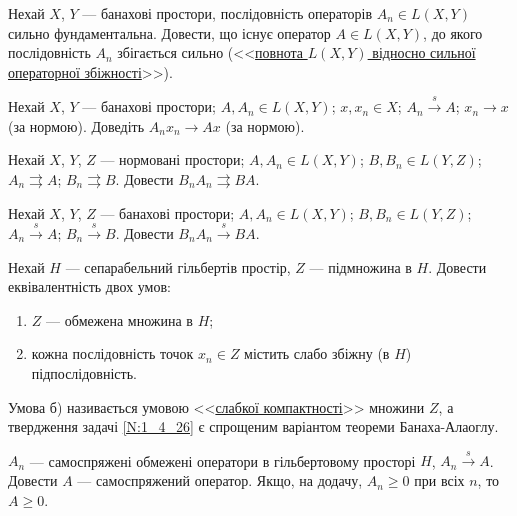 \begin{exercise}
    Нехай $X$, $Y$ --- банахові простори, послідовність операторів $A_n \in L(X,Y)$ сильно
    фундаментальна. Довести, що існує оператор $A \in L(X,Y)$, до якого послідовність $A_n$
    збігається сильно (<<\ul{повнота $L(X,Y)$ відносно сильної операторної збіжності}>>).
\end{exercise}

\begin{exercise}
    Нехай $X$, $Y$ --- банахові простори; $A, A_n \in L(X,Y)$; $x, x_n \in X$;
    $A_n \overset{s}{\to} A$; $x_n \to x$ (за нормою). Доведіть $A_n x_n \to Ax$ (за нормою).
\end{exercise}

\begin{exercise}
    Нехай $X$, $Y$, $Z$ --- нормовані простори; $A, A_n \in L(X,Y)$; $B, B_n \in L(Y,Z)$;
    $A_n \rightrightarrows A$; $B_n \rightrightarrows B$.
    Довести $B_n A_n \rightrightarrows BA$.
\end{exercise}

\begin{exercise}
    Нехай $X$, $Y$, $Z$ --- банахові простори; $A, A_n \in L(X,Y)$; $B, B_n \in L(Y,Z)$;
    $A_n \overset{s}{\to} A$; $B_n \overset{s}{\to} B$.
    Довести $B_n A_n \overset{s}{\to} BA$.
\end{exercise}

\begin{exercise}\label{N:1_4_26}
    Нехай $H$ --- сепарабельний гільбертів простір, $Z$ --- підмножина в $H$.
    Довести еквівалентність двох умов:
    \begin{enumerate}
        \item $Z$ --- обмежена множина в $H$;
        \item кожна послідовність точок $x_n \in Z$ містить слабо збіжну (в $H$) 
        підпослідовність.
    \end{enumerate}
\end{exercise}

\begin{theory}
    Умова б) називається умовою <<\uline{слабкої компактності}>> множини $Z$,
    а твердження задачі \ref{N:1_4_26} є спрощеним варіантом теореми Банаха-Алаоглу.
\end{theory}

\begin{exercise}
    $A_n$ --- самоспряжені обмежені оператори в гільбертовому просторі $H$,
    $A_n \overset{s}{\to} A$. Довести $A$ --- самоспряжений оператор.
    Якщо, на додачу, $A_n \geq 0$ при всіх $n$, то $A \geq 0$.
\end{exercise}


